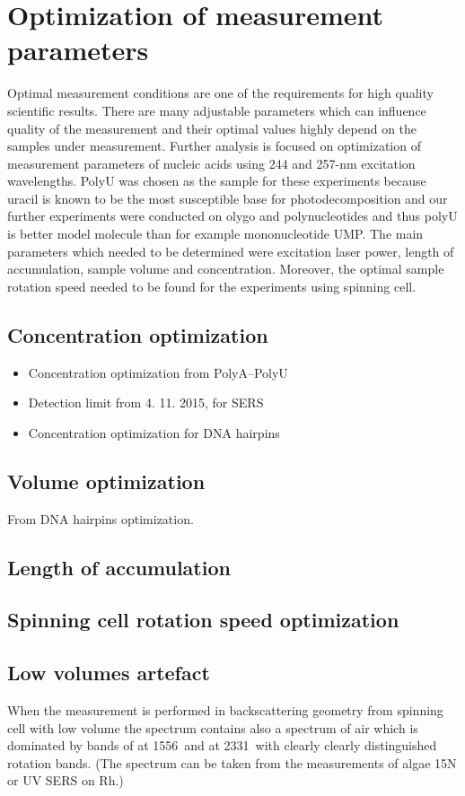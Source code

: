 \section{Optimization of measurement parameters}

Optimal measurement conditions are one of the requirements for high quality
scientific results. There are many adjustable parameters which can influence
quality of the measurement and their optimal values highly depend on the
samples under measurement. Further analysis is focused on optimization of
measurement parameters of nucleic acids using 244 and 257-nm excitation
wavelengths. PolyU was chosen as the sample for these experiments because
uracil is known to be the most susceptible base for photodecomposition and our
further experiments were conducted on olygo and polynucleotides and thus polyU
is better model molecule than for example mononucleotide UMP. The main
parameters which needed to be determined were excitation laser power, length of
accumulation, sample volume and concentration. Moreover, the optimal sample
rotation speed needed to be found for the experiments using spinning cell.




\subsection{Concentration optimization}
\begin{itemize}
	\item Concentration optimization from PolyA--PolyU
	\item Detection limit from 4. 11. 2015, for SERS
	\item Concentration optimization for DNA hairpins
\end{itemize}
\subsection{Volume optimization}
From DNA hairpins optimization.
\subsection{Length of accumulation}
\subsection{Spinning cell rotation speed optimization}
\subsection{Low volumes artefact}
When the measurement is performed in backscattering geometry from spinning cell
with low volume the spectrum contains also a spectrum of air which is dominated
by bands of  at 1556\,\icm{} and  at 2331\,\icm{} with clearly
clearly distinguished rotation bands. (The spectrum can be taken from the
measurements of algae 15N or UV SERS on Rh.)
